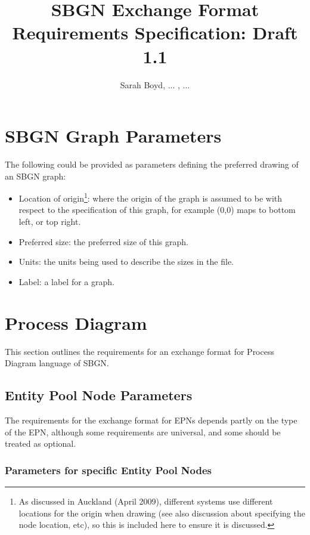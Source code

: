 \documentclass[11pt]{article}
\title{SBGN Exchange Format Requirements Specification: Draft 1.1}
\author{Sarah Boyd, ... , ...}
\begin{document}
\maketitle

\section{SBGN Graph Parameters}
\label{graph_params}

The following could be provided as parameters defining the preferred drawing of an SBGN graph:

\begin{itemize}
\item Location of origin\footnote{As discussed in Auckland (April 2009), different systems use different locations for the origin when drawing (see also discussion about specifying the node location, etc), so this is included here to ensure it is discussed.}: where the origin of the graph is assumed to be with respect to the specification of this graph, for example (0,0) maps to bottom left, or top right.
\item Preferred size: the preferred size of this graph.
\item Units: the units being used to describe the sizes in the file.
\item Label: a label for a graph.
\end{itemize}



\section{Process Diagram}

This section outlines the requirements for an exchange format for Process Diagram language of SBGN.


\subsection{Entity Pool Node Parameters}
\label{epn_params}

The requirements for the exchange format for EPNs depends partly on the type of the EPN, although some requirements are universal, and some should be treated as optional.

\subsubsection{Parameters for specific Entity Pool Nodes}
\end{document}
